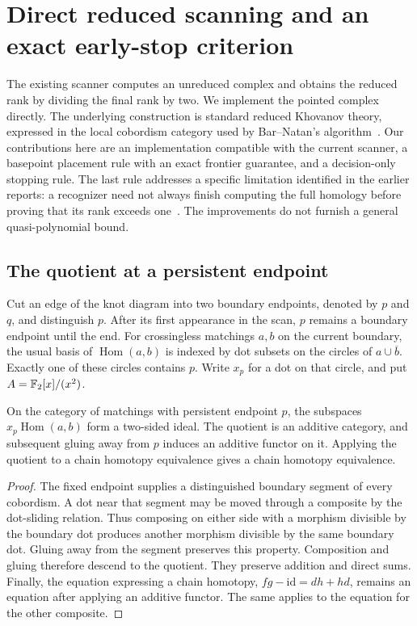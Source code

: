 \section{Direct reduced scanning and an exact early-stop criterion}
\label{sec:pointed}

The existing scanner computes an unreduced complex and obtains the reduced
rank by dividing the final rank by two.  We implement the pointed complex
directly.  The underlying construction is standard reduced Khovanov theory,
expressed in the local cobordism category used by Bar--Natan's
algorithm~\cite{barnatan2005,barnatan2007}.  Our contributions here are an
implementation compatible with the current scanner, a basepoint placement
rule with an exact frontier guarantee, and a decision-only stopping rule.
The last rule addresses a specific limitation identified in the earlier
reports: a recognizer need not always finish computing the full homology
before proving that its rank exceeds one~\cite{repository}.  The improvements
do not furnish a general quasi-polynomial bound.

\subsection{The quotient at a persistent endpoint}

Cut an edge of the knot diagram into two boundary endpoints, denoted by
$p$ and $q$, and distinguish $p$.  After its first appearance in the scan,
$p$ remains a boundary endpoint until the end.  For crossingless matchings
$a,b$ on the current boundary, the usual basis of
$\operatorname{Hom}(a,b)$ is indexed by dot subsets on the circles of
$a\cup\overline b$.  Exactly one of these circles contains $p$.
Write $x_p$ for a dot on that circle, and put
$A=\mathbb{F}_2[x]/(x^2)$.

\begin{proposition}
\label{prop:pointedquotient}
On the category of matchings with persistent endpoint $p$, the subspaces
$x_p\operatorname{Hom}(a,b)$ form a two-sided ideal.  The quotient is an
additive category, and subsequent gluing away from $p$ induces an additive
functor on it.  Applying the quotient to a chain homotopy equivalence gives
a chain homotopy equivalence.
\end{proposition}

\begin{proof}
The fixed endpoint supplies a distinguished boundary segment of every
cobordism.  A dot near that segment may be moved through a composite by
the dot-sliding relation.  Thus composing on either side with a morphism
divisible by the boundary dot produces another morphism divisible by the
same boundary dot.  Gluing away from the segment preserves this property.
Composition and gluing therefore descend to the quotient.  They preserve
addition and direct sums.  Finally, the equation expressing a chain homotopy,
$fg-\mathrm{id}=dh+hd$, remains an equation after applying an additive
functor.  The same applies to the equation for the other composite.
\end{proof}

